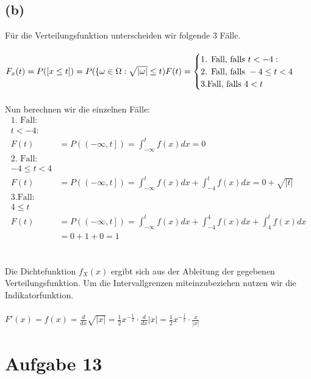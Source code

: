 \documentclass[a4paper]{scrartcl}
\begin{document}
\subsection*{(b)}
Für die Verteilungsfunktion unterscheiden wir folgende 3 Fälle.\\
\\
$
F_x(t) = P(\left[x \leq t \right])\\
=P(\lbrace \omega \in \Omega: \sqrt{|\omega|} \leq t)\\
\\
F(t) = 
\begin{cases}
\text{1. Fall, falls } t < -4:\\
\text{2. Fall, falls } -4 \leq t < 4\\
\text{3.Fall, falls } 4 < t
\end{cases}
$\\\\
Nun berechnen wir die einzelnen Fälle:\\
\begin{align*}
	\text{1. Fall:}&\\
	t < -4:&\\
	F(t) &= P(\left(-\infty, t\right]) = \int_{-\infty}^{t} f(x)dx = 0\\
	\text{2. Fall:}&\\
	-4 \leq t < 4&\\
	F(t) &= P(\left(-\infty, t\right]) = \int_{-\infty}^{t} f(x)dx + \int_{-4}^{t}f(x)dx = 0 + \sqrt{|t|}\\
	\text{3.Fall:}&\\
	4 \leq t&\\
	F(t) &= P(\left(-\infty, t\right]) =\int_{-\infty}^{t} f(x)dx + \int_{-4}^{4}f(x)dx + \int_{4}^{t}f(x)dx\\
	&=0+1+0 = 1
\end{align*}\\
\\
Die Dichtefunktion $f_X(x)$ ergibt sich aus der Ableitung der gegebenen Verteilungsfunktion. Um die Intervallgrenzen miteinzubeziehen nutzen wir die Indikatorfunktion.\\\\
$
F'(x) = f(x) = \frac{d}{dx}\sqrt{|x|} = \frac{1}{2}x^{-\frac{1}{2}} \cdot \frac{d}{dx}|x| = \frac{1}{2}x^{-\frac{1}{2}} \cdot \frac{x}{|x|}
$




\section*{Aufgabe 13}
\end{document}
